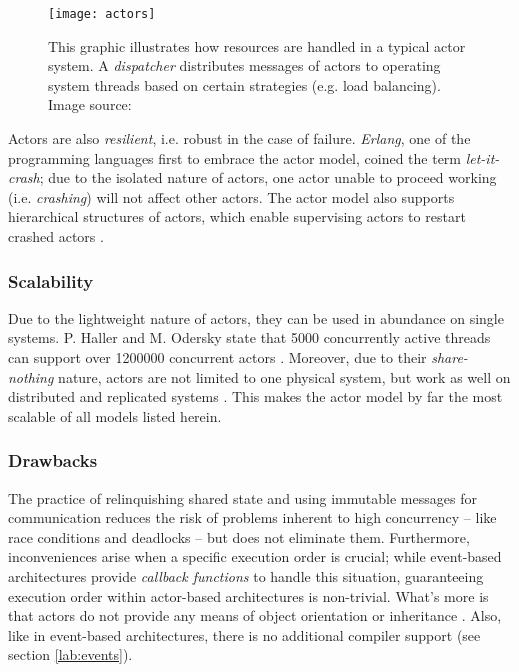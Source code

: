 \begin{figure}
\centering\small
\setlength{\tabcolsep}{0mm}
  \texttt{[image: actors]}
\caption{This graphic illustrates how resources are handled in a typical actor system. A \textit{dispatcher} distributes messages of actors to operating system threads based on certain strategies (e.g. load balancing). Image source: \cite{Gupta2012}}
\label{fig:gil}
\end{figure}

Actors are also \textit{resilient}, i.e. robust in the case of failure. \textit{Erlang}, one of the programming languages first to embrace the actor model, coined the term \textit{let-it-crash}; due to the isolated nature of actors, one actor unable to proceed working (i.e. \textit{crashing}) will not affect other actors. The actor model also supports hierarchical structures of actors, which enable supervising actors to restart crashed actors \cite{Armstrong2007}.

\subsubsection*{Scalability}
Due to the lightweight nature of actors, they can be used in abundance on single systems. P. Haller and M. Odersky state that 5000 concurrently active threads can support over 1200000 concurrent actors \cite[p. 2]{Haller2009}. Moreover, due to their \textit{share-nothing} nature, actors are not limited to one physical system, but work as well on distributed and replicated systems \cite[p. 233]{Gupta2012}. This makes the actor model by far the most scalable of all models listed herein. 

\subsubsection*{Drawbacks}
The practice of relinquishing shared state and using immutable messages for communication reduces the risk of problems inherent to high concurrency -- like race conditions and deadlocks -- but does not eliminate them. Furthermore, inconveniences arise when a specific execution order is crucial; while event-based architectures provide \textit{callback functions} to handle this situation, guaranteeing execution order within actor-based architectures is non-trivial. What's more is that actors do not provide any means of object orientation or inheritance \cite{Mackay97}. Also, like in event-based architectures, there is no additional compiler support (see section \ref{lab:events}).
